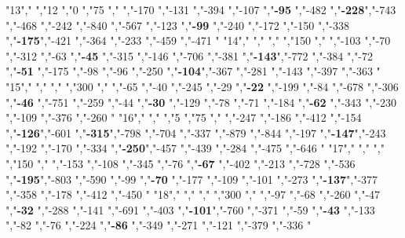 "13","        ","12   ","0   ","75  ","     ","-170          ","-131          ","-394          ","-107          ","\textbf{-95} ","-482          ","\textbf{-228}","-743          ","-468          ","-242          ","-840          ","-567          ","-123          ","\textbf{-99} ","-240          ","-172          ","-150          ","-338          ","\textbf{-175}","-421          ","-364          ","-233          ","-459          ","-471          "
"14","        ","     ","    ","150 ","     ","-103          ","-70           ","-312          ","-63           ","\textbf{-45} ","-315          ","-146          ","-706          ","-381          ","\textbf{-143}","-772          ","-384          ","-72           ","\textbf{-51} ","-175          ","-98           ","-96           ","-250          ","\textbf{-104}","-367          ","-281          ","-143          ","-397          ","-363          "
"15","        ","     ","    ","300 ","     ","-65           ","-40           ","-245          ","-29           ","\textbf{-22} ","-199          ","-84           ","-678          ","-306          ","\textbf{-46} ","-751          ","-259          ","-44           ","\textbf{-30} ","-129          ","-78           ","-71           ","-184          ","\textbf{-62} ","-343          ","-230          ","-109          ","-376          ","-260          "
"16","        ","     ","5   ","75  ","     ","-247          ","-186          ","-412          ","-154          ","\textbf{-126}","-601          ","\textbf{-315}","-798          ","-704          ","-337          ","-879          ","-844          ","-197          ","\textbf{-147}","-243          ","-192          ","-170          ","-334          ","\textbf{-250}","-457          ","-439          ","-284          ","-475          ","-646          "
"17","        ","     ","    ","150 ","     ","-153          ","-108          ","-345          ","-76           ","\textbf{-67} ","-402          ","-213          ","-728          ","-536          ","\textbf{-195}","-803          ","-590          ","-99           ","\textbf{-70} ","-177          ","-109          ","-101          ","-273          ","\textbf{-137}","-377          ","-358          ","-178          ","-412          ","-450          "
"18","        ","     ","    ","300 ","     ","-97           ","-68           ","-260          ","-47           ","\textbf{-32} ","-288          ","-141          ","-691          ","-403          ","\textbf{-101}","-760          ","-371          ","-59           ","\textbf{-43} ","-133          ","-82           ","-76           ","-224          ","\textbf{-86} ","-349          ","-271          ","-121          ","-379          ","-336          "
